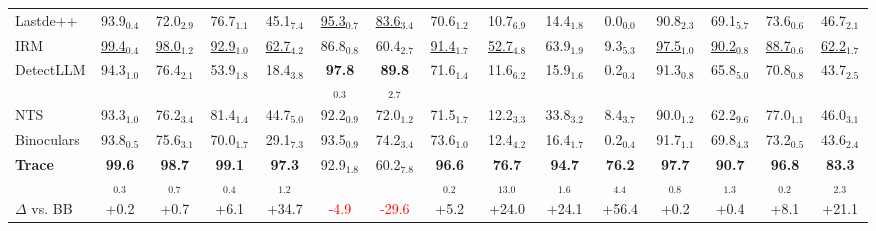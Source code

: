 \begin{tabular}{lcccccccccccccc}
Lastde++ & 93.9$_{0.4}$ & 72.0$_{2.9}$ & 76.7$_{1.1}$ & 45.1$_{7.4}$ & \cellcolor{orange!25}\underline{95.3$_{0.7}$} & \cellcolor{orange!25}\underline{83.6$_{3.4}$} & 70.6$_{1.2}$ & 10.7$_{6.9}$ & 14.4$_{1.8}$ & 0.0$_{0.0}$ & 90.8$_{2.3}$ & 69.1$_{5.7}$ & 73.6$_{0.6}$ & 46.7$_{2.1}$ \\
IRM & \cellcolor{orange!25}\underline{99.4$_{0.4}$} & \cellcolor{orange!25}\underline{98.0$_{1.2}$} & \cellcolor{orange!25}\underline{92.9$_{1.0}$} & \cellcolor{orange!25}\underline{62.7$_{4.2}$} & 86.8$_{0.8}$ & 60.4$_{2.7}$ & \cellcolor{orange!25}\underline{91.4$_{1.7}$} & \cellcolor{orange!25}\underline{52.7$_{4.8}$} & 63.9$_{1.9}$ & 9.3$_{5.3}$ & \cellcolor{orange!25}\underline{97.5$_{1.0}$} & \cellcolor{orange!25}\underline{90.2$_{0.8}$} & \cellcolor{orange!25}\underline{88.7$_{0.6}$} & \cellcolor{orange!25}\underline{62.2$_{1.7}$} \\
DetectLLM & 94.3$_{1.0}$ & 76.4$_{2.1}$ & 53.9$_{1.8}$ & 18.4$_{3.8}$ & \cellcolor{cyan!25}\textbf{97.8$_{0.3}$} & \cellcolor{cyan!25}\textbf{89.8$_{2.7}$} & 71.6$_{1.4}$ & 11.6$_{6.2}$ & 15.9$_{1.6}$ & 0.2$_{0.4}$ & 91.3$_{0.8}$ & 65.8$_{5.0}$ & 70.8$_{0.8}$ & 43.7$_{2.5}$ \\
NTS & 93.3$_{1.0}$ & 76.2$_{3.4}$ & 81.4$_{1.4}$ & 44.7$_{5.0}$ & 92.2$_{0.9}$ & 72.0$_{1.2}$ & 71.5$_{1.7}$ & 12.2$_{3.3}$ & 33.8$_{3.2}$ & 8.4$_{3.7}$ & 90.0$_{1.2}$ & 62.2$_{9.6}$ & 77.0$_{1.1}$ & 46.0$_{3.1}$ \\
Binoculars & 93.8$_{0.5}$ & 75.6$_{3.1}$ & 70.0$_{1.7}$ & 29.1$_{7.3}$ & 93.5$_{0.9}$ & 74.2$_{3.4}$ & 73.6$_{1.0}$ & 12.4$_{4.2}$ & 16.4$_{1.7}$ & 0.2$_{0.4}$ & 91.7$_{1.1}$ & 69.8$_{4.3}$ & 73.2$_{0.5}$ & 43.6$_{2.4}$ \\
\midrule
\textbf{Trace} & \cellcolor{cyan!25}\textbf{99.6$_{0.3}$} & \cellcolor{cyan!25}\textbf{98.7$_{0.7}$} & \cellcolor{cyan!25}\textbf{99.1$_{0.4}$} & \cellcolor{cyan!25}\textbf{97.3$_{1.2}$} & 92.9$_{1.8}$ & 60.2$_{7.8}$ & \cellcolor{cyan!25}\textbf{96.6$_{0.2}$} & \cellcolor{cyan!25}\textbf{76.7$_{13.0}$} & \cellcolor{cyan!25}\textbf{94.7$_{1.6}$} & \cellcolor{cyan!25}\textbf{76.2$_{4.4}$} & \cellcolor{cyan!25}\textbf{97.7$_{0.8}$} & \cellcolor{cyan!25}\textbf{90.7$_{1.3}$} & \cellcolor{cyan!25}\textbf{96.8$_{0.2}$} & \cellcolor{cyan!25}\textbf{83.3$_{2.3}$} \\
$\Delta$ vs. BB & \textcolor{green!60!black}{+0.2} & \textcolor{green!60!black}{+0.7} & \textcolor{green!60!black}{+6.1} & \textcolor{green!60!black}{+34.7} & \textcolor{red}{-4.9} & \textcolor{red}{-29.6} & \textcolor{green!60!black}{+5.2} & \textcolor{green!60!black}{+24.0} & \textcolor{green!60!black}{+24.1} & \textcolor{green!60!black}{+56.4} & \textcolor{green!60!black}{+0.2} & \textcolor{green!60!black}{+0.4} & \textcolor{green!60!black}{+8.1} & \textcolor{green!60!black}{+21.1} \\
\bottomrule
\end{tabular}
